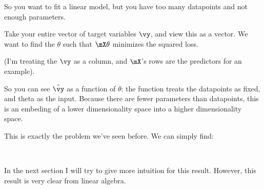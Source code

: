 So you want to fit a linear model, but you have too many datapoints
and not enough parameters.

Take your entire vector of target variables $\vy$, and view this as a
vector. We want to find the $\theta$ such that $\mX\theta$ minimizes the
squared loss.

(I'm treating the $\vy$ as a column, and $\mX$'s rows are the predictors
for an example).

So you can see $\hat{\vy}$ as a function of $\theta$: the function treats
the datapoints as fixed, and theta as the input. Because there are fewer
parameters than datapoints, this is an embeding of a lower
dimensionality space into a higher dimensionality space.

This is exactly the problem we've seen before. We can simply find:

\begin{nedqn}
  \hat{\theta}
\eqcol
  \parensinv{\mXt\mX} \mXt \vy
\\
  \hat{\vy}
\eqcol
  \mX \hat{\theta}
\end{nedqn}

In the next section I will try to give more intuition for this
result. However, this result is very clear from linear algebra.
